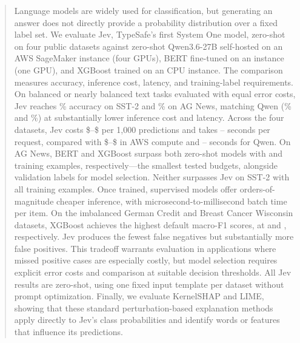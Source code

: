 \begin{abstract}
Language models are widely used for classification, but generating an answer does not directly
provide a probability distribution over a fixed label set. We evaluate Jev, TypeSafe's first
System One model, zero-shot on four public datasets against zero-shot Qwen3.6-27B self-hosted on
an AWS SageMaker \texttt{\QwenScoringInstance} instance (four \QwenGpu{} GPUs), BERT fine-tuned
on an \texttt{\AwsInstanceTypeBert} instance (one \BertGpu{} GPU), and XGBoost trained on an
\texttt{\AwsInstanceTypeXgb} CPU instance. The comparison measures accuracy, inference cost,
latency, and training-label requirements. On balanced or nearly balanced text tasks evaluated
with equal error costs, Jev reaches \AccPctJevSst\% accuracy on SST-2 and \AccPctJevAgnews\% on
AG News, matching Qwen (\AccPctQwenSst\% and \AccPctQwenAgnews\%) at substantially lower
inference cost and latency. Across the four datasets, Jev costs
\$\CostPerKJevSst--\$\CostPerKJevWdbc{} per 1,000 predictions and takes
\JevLatencyWdbc--\JevLatencySst{} seconds per request, compared with
\$\CostPerKQwenSst--\$\CostPerKQwenWdbc{} in AWS compute and
\QwenLatencySst--\QwenLatencyWdbc{} seconds for Qwen. On AG News, BERT and XGBoost surpass both
zero-shot models with \LabelsToMatchJevBertAgnews{} and \LabelsToMatchJevXgbAgnews{} training
examples, respectively---the smallest tested budgets, alongside validation labels for model
selection. Neither surpasses Jev on SST-2 with all \NTrainSst{} training examples. Once trained,
supervised models offer orders-of-magnitude cheaper inference, with microsecond-to-millisecond
batch time per item. On the imbalanced German Credit and Breast Cancer Wisconsin datasets,
XGBoost achieves the highest default macro-F1 scores, at \MacroFOneXgbGerman{} and
\MacroFOneXgbWdbc, respectively. Jev produces the fewest false negatives but substantially more
false positives. This tradeoff warrants evaluation in applications where missed positive cases
are especially costly, but model selection requires explicit error costs and comparison at
suitable decision thresholds. All Jev results are zero-shot, using one fixed input template per
dataset without prompt optimization. Finally, we evaluate KernelSHAP and LIME, showing that these
standard perturbation-based explanation methods apply directly to Jev's class probabilities and
identify words or features that influence its predictions.
\end{abstract}
